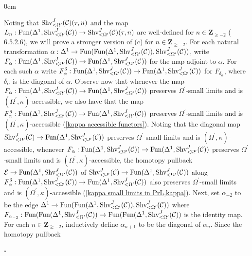 \documentclass[10pt]{article}
\newcommand{\C}{\mathcal C}
\newcommand{\cE}{\mathcal{E}}
\newcommand{\ZZ}{\mathbb{Z}}
\def\ZZ{{\mathbf Z}}
\renewcommand{\qed}{\hfill$\square$}
\renewenvironment{proof}{\begin{addmargin}[1em]{0em}\begin{newproof}}{\end{newproof}\end{addmargin}\qed}
\theoremstyle{witharg}
\theoremstyle{witharg}
\theoremstyle{witharg2}
\begin{document}
\begin{proof}
\begin{itemize}
     \end{itemize}

     \noindent Noting that $\textnormal{Shv}^J_{<\Omega^\prime}(\C)(\tau,n)$ and the map $L_n:\textnormal{Fun}(\Delta^1,\textnormal{Shv}^J_{<\Omega^\prime}(\C))\rightarrow \textnormal{Shv}^J_{<\Omega^\prime}(\C)(\tau,n)$ are well-defined for $n\in \ZZ_{\geq -2}$ ( 6.5.2.6), we will prove a stronger version of (c) for $n\in \ZZ_{\geq -2}$. For each natural transformation $\alpha:\Delta^1\rightarrow \textnormal{Fun}(\textnormal{Fun}(\Delta^1,\textnormal{Shv}^J_{<\Omega^\prime}(\C)),\textnormal{Shv}^J_{<\Omega^\prime}(\C))$, write $F_\alpha:\textnormal{Fun}(\Delta^1,\textnormal{Shv}^J_{<\Omega^\prime}(\C))\rightarrow \textnormal{Fun}(\Delta^1,\textnormal{Shv}^J_{<\Omega^\prime}(\C))$ for the map adjoint to $\alpha$. For each such $\alpha$ write $F_\alpha^\delta:\textnormal{Fun}(\Delta^1,\textnormal{Shv}^J_{<\Omega^\prime}(\C))\rightarrow \textnormal{Fun}(\Delta^1,\textnormal{Shv}^J_{<\Omega^\prime}(\C))$ for $F_{\delta_\alpha}$, where $\delta_\alpha$ is the diagonal of $\alpha$. Observe now that whenever the map $F_\alpha:\textnormal{Fun}(\Delta^1,\textnormal{Shv}^J_{<\Omega^\prime}(\C))\rightarrow \textnormal{Fun}(\Delta^1,\textnormal{Shv}^J_{<\Omega^\prime}(\C))$ preserves $\Omega^\prime$-small limits and is $(\Omega^\prime,\kappa)$-accessible, we also have that the map $F_{\alpha}^\delta:\textnormal{Fun}(\Delta^1,\textnormal{Shv}^J_{<\Omega^\prime}(\C))\rightarrow \textnormal{Fun}(\Delta^1,\textnormal{Shv}^J_{<\Omega^\prime}(\C))$ preserves $\Omega^\prime$-small limits and is $(\Omega^\prime,\kappa)$-accessible (\ref{kappa accessible functors}). Noting that the diagonal map $\textnormal{Shv}^J_{<\Omega^\prime}(\C)\rightarrow \textnormal{Fun}(\Delta^1,\textnormal{Shv}^J_{<\Omega^\prime}(\C))$ preserves $\Omega^\prime$-small limits and is $(\Omega^\prime,\kappa)$-accessible, whenever $F_\alpha:\textnormal{Fun}(\Delta^1,\textnormal{Shv}^J_{<\Omega^\prime}(\C))\rightarrow \textnormal{Fun}(\Delta^1,\textnormal{Shv}^J_{<\Omega^\prime}(\C))$ preserves $\Omega^\prime$-small limits and is $(\Omega^\prime,\kappa)$-accessible, the homotopy pullback $\cE\rightarrow \textnormal{Fun}(\Delta^1,\textnormal{Shv}^J_{<\Omega^\prime}(\C))$ of $\textnormal{Shv}^J_{<\Omega^\prime}(\C)\rightarrow \textnormal{Fun}(\Delta^1,\textnormal{Shv}^J_{<\Omega^\prime}(\C))$ along $F^\delta_\alpha:\textnormal{Fun}(\Delta^1,\textnormal{Shv}^J_{<\Omega^\prime}(\C))\rightarrow \textnormal{Fun}(\Delta^1,\textnormal{Shv}^J_{<\Omega^\prime}(\C))$ also preserves $\Omega^\prime$-small limits and is $(\Omega^\prime,\kappa)$-accessible (\ref{kappa small limits in PrL,kappa}). Next, set $\alpha_{-2}$ to be the edge $\Delta^1\rightarrow \textnormal{Fun}(\textnormal{Fun}(\Delta^1,\textnormal{Shv}^J_{<\Omega^\prime}(\C)),\textnormal{Shv}^J_{<\Omega^\prime}(\C))$ where $F_{\alpha_{-2}}:\textnormal{Fun}(\textnormal{Fun}(\Delta^1,\textnormal{Shv}^J_{<\Omega^\prime}(\C))\rightarrow \textnormal{Fun}(\textnormal{Fun}(\Delta^1,\textnormal{Shv}^J_{<\Omega^\prime}(\C))$ is the identity map. For each $n\in \ZZ_{\geq -2}$, inductively define $\alpha_{n+1}$ to be the diagonal of $\alpha_{n}$. Since the homotopy pullback 
\end{proof}
\end{document}
